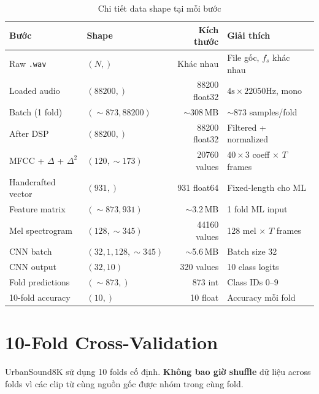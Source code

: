 \documentclass[12pt,a4paper]{article}
\begin{document}
\begin{table}[H]
\centering
\caption{Chi tiết data shape tại mỗi bước}
\label{tab:data-shapes}
\begin{tabular}{@{}llrl@{}}
\toprule
\textbf{Bước} & \textbf{Shape} & \textbf{Kích thước} & \textbf{Giải thích} \\
\midrule
Raw \texttt{.wav}        & $(N,)$                 & Khác nhau     & File gốc, $f_s$ khác nhau \\
Loaded audio             & $(88200,)$             & 88200 float32 & $4\text{s} \times 22050\text{Hz}$, mono \\
Batch (1 fold)           & $(\sim\!873, 88200)$   & $\sim$308\,MB & $\sim$873 samples/fold \\
After DSP                & $(88200,)$             & 88200 float32 & Filtered + normalized \\
MFCC + $\Delta$ + $\Delta^2$ & $(120, \sim\!173)$ & 20760 values  & $40 \times 3$ coeff $\times$ $T$ frames \\
Handcrafted vector       & $(931,)$               & 931 float64   & Fixed-length cho ML \\
Feature matrix           & $(\sim\!873, 931)$     & $\sim$3.2\,MB & 1 fold ML input \\
Mel spectrogram          & $(128, \sim\!345)$     & 44160 values  & 128 mel $\times$ $T$ frames \\
CNN batch                & $(32, 1, 128, \sim\!345)$ & $\sim$5.6\,MB & Batch size 32 \\
CNN output               & $(32, 10)$             & 320 values    & 10 class logits \\
Fold predictions         & $(\sim\!873,)$         & 873 int       & Class IDs $0$--$9$ \\
10-fold accuracy         & $(10,)$                & 10 float      & Accuracy mỗi fold \\
\bottomrule
\end{tabular}
\end{table}


\section{10-Fold Cross-Validation}

UrbanSound8K sử dụng 10 folds cố định. \textbf{Không bao giờ shuffle} dữ liệu across folds vì các clip từ cùng nguồn gốc được nhóm trong cùng fold.
\end{document}
